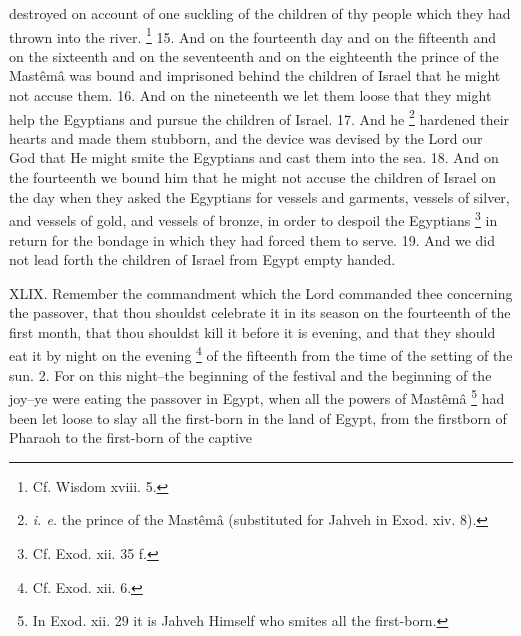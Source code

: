 destroyed on account of one suckling of the children of thy people which they had thrown into the river. \footnote{Cf. Wisdom xviii. 5.} 15. And on the fourteenth day and on the fifteenth and on the sixteenth and on the seventeenth and on the eighteenth the prince of the Mastêmâ was bound and imprisoned behind the children of Israel that he might not accuse them. 16. And on the nineteenth we let them loose that they might help the Egyptians and pursue the children of Israel. 17. And he \footnote{\emph{i. e.} the prince of the Mastêmâ (substituted for Jahveh in Exod. xiv. 8).} hardened their hearts and made them stubborn, and the device was devised by the Lord our God that He might smite the Egyptians and cast them into the sea. 18. And on the fourteenth we bound him that he might not accuse the children of Israel on the day when they asked the Egyptians for vessels and garments, vessels of silver, and vessels of gold, and vessels of bronze, in order to despoil the Egyptians \footnote{Cf. Exod. xii. 35 f.} in return for the bondage in which they had forced them to serve. 19. And we did not lead forth the children of Israel from Egypt empty handed.


XLIX. Remember the commandment which the Lord commanded thee concerning the passover, that thou shouldst celebrate it in its season on the fourteenth of the first month, that thou shouldst kill it before it is evening, and that they should eat it by night on the evening \footnote{Cf. Exod. xii. 6.} of the fifteenth from the time of the setting of the sun. 2. For on this night--the beginning of the festival and the beginning of the joy--ye were eating the passover in Egypt, when all the powers of Mastêmâ \footnote{In Exod. xii. 29 it is Jahveh Himself who smites all the first-born.} had been let loose to slay all the first-born in the land of Egypt, from the firstborn of Pharaoh to the first-born of the captive

